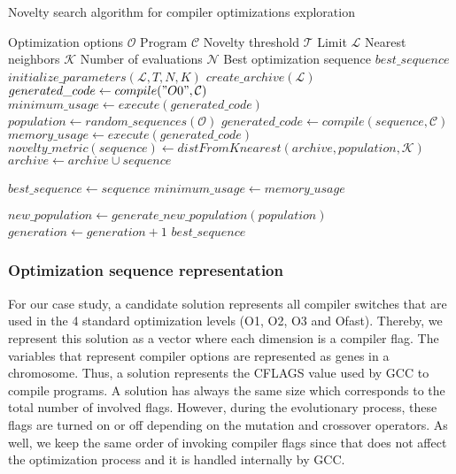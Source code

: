 \begin{algorithm}
	\caption{Novelty search algorithm for compiler optimizations exploration}
	\label{algo:search}
	\begin{algorithmic}[1]
		\REQUIRE Optimization options $\mathcal{O}$
		\REQUIRE Program $\mathcal{C}$
		\REQUIRE Novelty threshold $\mathcal{T}$
		\REQUIRE Limit $\mathcal{L}$
		\REQUIRE Nearest neighbors $\mathcal{K}$
		\REQUIRE Number of evaluations $\mathcal{N}$
		\ENSURE Best optimization sequence $best\_sequence$
		\STATE $initialize\_parameters(\mathcal{L},T,N,K)$
		\STATE $create\_archive(\mathcal{L})$
		\STATE 	$generated\_code \gets compile("O0",\mathcal{C})$
		\STATE 	$minimum\_usage \gets execute(generated\_code)$
		\STATE $population \gets random\_sequences(\mathcal{O})$
		\REPEAT
		\STATE 	$generated\_code \gets compile(sequence,\mathcal{C})$
		\STATE 	$memory\_usage \gets execute(generated\_code)$
		\STATE	$novelty\_metric(sequence) \gets distFromKnearest(archive,population,\mathcal{K})$
		\STATE	$archive \gets archive \cup sequence$
		\ENDIF
		
			\STATE	$best\_sequence \gets sequence$
			\STATE	$minimum\_usage \gets memory\_usage$
			\ENDIF
			
		\ENDFOR
		\STATE		$new\_population \gets generate\_new\_population(population)$
		\STATE		$generation \gets generation + 1$
		\RETURN $best\_sequence$
	\end{algorithmic}
\end{algorithm}


\subsubsection{Optimization sequence representation}
For our case study, a candidate solution represents all compiler switches that are used in the 4 standard optimization levels (O1, O2, O3 and Ofast). Thereby, we represent this solution as a vector where each dimension is a compiler flag. 
The variables that represent compiler options are represented as genes in a chromosome. 
Thus, a solution represents the CFLAGS value used by GCC to compile programs.
A solution has always the same size which corresponds to the total number of involved flags. 
However, during the evolutionary process, these flags are turned on or off depending on the mutation and crossover operators. As well, we keep the same order of invoking compiler flags since that does not affect the optimization process and it is handled internally by GCC.

